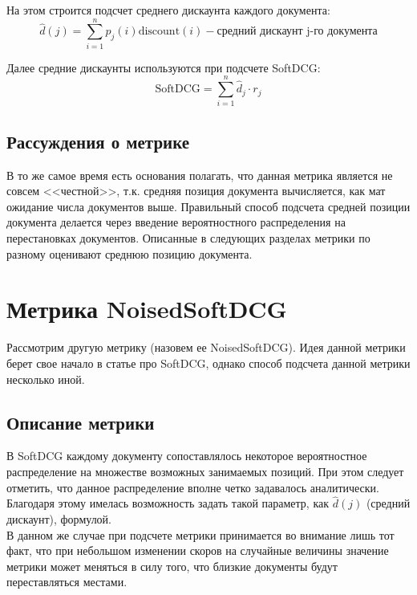 \documentclass[14pt,a4paper]{amsart}
\theoremstyle{definition}
\theoremstyle{definition}
\newcommand{\Sum}{\sum\limits}
\renewcommand\t{\text}
\begin{document}
На этом строится подсчет среднего дискаунта каждого документа: $$\hat{d}(j) = \Sum_{i=1}^n p_j(i) \t{discount}(i) - \t{средний дискаунт j-го документа}$$

Далее средние дискаунты используются при подсчете SoftDCG: $$\t{SoftDCG} = \Sum_{i=1}^n \hat{d}_j \cdot r_j$$

\subsection{Рассуждения о метрике}

В то же самое время есть основания полагать, что данная метрика является не совсем <<честной>>, т.к. средняя позиция документа вычисляется, как мат ожидание числа документов выше. Правильный способ подсчета средней позиции документа делается через введение вероятностного распределения на перестановках документов. Описанные в следующих разделах метрики по разному оценивают среднюю позицию документа.


\newpage
\section{Метрика NoisedSoftDCG}

Рассмотрим другую метрику (назовем ее NoisedSoftDCG). Идея данной метрики берет свое начало в статье про SoftDCG, однако способ подсчета данной метрики несколько иной. \\

\subsection{Описание метрики}

В SoftDCG каждому документу сопоставлялось некоторое вероятностное распределение на множестве возможных занимаемых позиций. При этом следует отметить, что данное распределение вполне четко задавалось аналитически. Благодаря этому имелась возможность задать такой параметр, как $\hat{d}(j)$ (средний дискаунт), формулой. \\

В данном же случае при подсчете метрики принимается во внимание лишь тот факт, что при небольшом изменении скоров на случайные величины значение метрики может меняться в силу того, что близкие документы будут переставляться местами. \\
\end{document}
